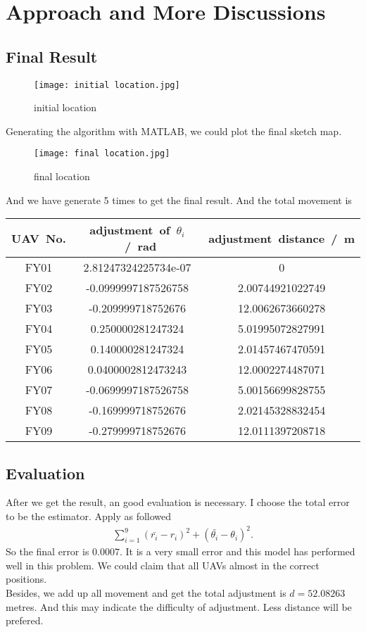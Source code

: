 \documentclass[11pt,en]{elegantpaper}
\begin{document}
\section{Approach and More Discussions}
\subsection{Final Result}

\begin{figure}[htbp]
  \centering
  \texttt{[image: initial location.jpg]}
  \caption{initial location}
\end{figure}

Generating the algorithm with MATLAB, we could plot the final sketch map.

\begin{figure}[htbp]
  \centering
  \texttt{[image: final location.jpg]}
  \caption{final location}
\end{figure}

And we have generate 5 times to get the final result.
And the total movement is 
\begin{center}
	\begin{tabular}{|c|c|c|}
		\hline
		\mbox{UAV No.}&\mbox{adjustment of $\theta_i$ / rad}&\mbox{adjustment distance / m}\\
		\hline
		FY01&2.81247324225734e-07&0\\
		\hline
		FY02&-0.0999997187526758&2.00744921022749\\
		\hline
		FY03&-0.209999718752676&12.0062673660278\\
		\hline
		FY04&0.250000281247324&5.01995072827991\\
		\hline
		FY05&0.140000281247324&2.01457467470591\\
		\hline
		FY06&0.0400002812473243&12.0002274487071\\
		\hline
		FY07&-0.0699997187526758&5.00156699828755\\
		\hline
		FY08&-0.169999718752676&2.02145328832454\\
		\hline
		FY09&-0.279999718752676&12.0111397208718\\
		\hline
	\end{tabular}
\end{center}

\subsection{Evaluation}
After we get the result, an good evaluation is necessary.
I choose the total error to be the estimator.
Apply as followed
\begin{align*}
  \sum_{i=1}^{9} (\bar{r_i} - r_i)^2 + (\bar{\theta_i}-\theta_i)^2.
\end{align*}
So the final error is $0.0007$.
It is a very small error and this model has performed well in this problem.
We could claim that all UAVs almost in the correct positions.\\
Besides, we add up all movement and get the total adjustment is $d=52.08263$ metres.
And this may indicate the difficulty of adjustment.
Less distance will be prefered.
\end{document}
